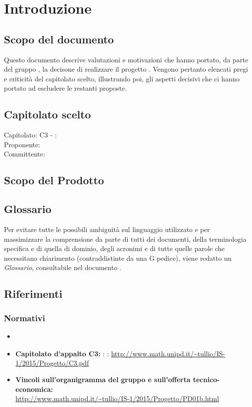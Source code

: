 \section{Introduzione}

\subsection{Scopo del documento}
Questo documento descrive valutazioni e motivazioni che hanno portato, da parte del gruppo \GroupName{}, la decisone di realizzare il progetto \ProjectName{}. 
Vengono pertanto elencati pregi e criticità del capitolato scelto, illustrando poi, gli aspetti decisivi che ci hanno portato ad escludere le restanti proposte. 

\subsection{Capitolato scelto}
Capitolato: C3 - \ProjectName{}: \ProjectNameSub{}\\
Proponente: \Proponente{} \\
Committente: \committente{} \\

\subsection{Scopo del Prodotto}
\ScopoDelProdotto

\subsection{Glossario}
Per evitare tutte le possibili ambiguità sul linguaggio utilizzato e per massimizzare la comprensione da parte di tutti dei documenti, della terminologia specifica e di quella di dominio, degli acronimi e di tutte quelle parole che necessitano chiarimento (contraddistinte da una G pedice), viene redatto un \textit{Glossario}, consultabile nel documento \Glossario.

\subsection{Riferimenti}
\subsubsection{Normativi}
\begin{itemize}
	\item \textbf{\NormeDiProgetto}
	\item\textbf{ Capitolato d'appalto C3:} \ProjectName{}: \ProjectNameSub{}: \url{http://www.math.unipd.it/~tullio/IS-1/2015/Progetto/C3.pdf}
	\item \textbf{Vincoli sull'organigramma del gruppo e sull'offerta tecnico-economica:} \\ \url{http://www.math.unipd.it/~tullio/IS-1/2015/Progetto/PD01b.html}
\end{itemize}

